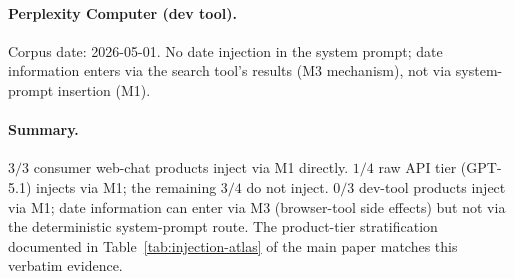 \paragraph{Perplexity Computer (dev tool).}
Corpus date: 2026-05-01. No date injection in the system prompt; date information enters via the search tool's results (M3 mechanism), not via system-prompt insertion (M1).

\paragraph{Summary.}
$3/3$ consumer web-chat products inject via M1 directly. $1/4$ raw API tier (GPT-5.1) injects via M1; the remaining $3/4$ do not inject. $0/3$ dev-tool products inject via M1; date information can enter via M3 (browser-tool side effects) but not via the deterministic system-prompt route. The product-tier stratification documented in Table~\ref{tab:injection-atlas} of the main paper matches this verbatim evidence.
